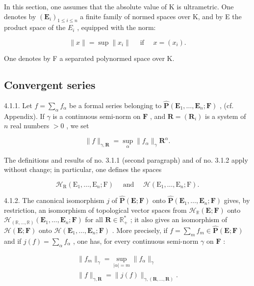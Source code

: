 In this section, one assumes that the absolute value of K is ultrametric. One denotes by \((\mathbf{E}_{i})_{1\leqslant i\leqslant n}\) a finite family of normed spaces over K, and by E the product space of the \(E_{i}\) , equipped with the norm:

\[
\| x \| = \sup \| x _ {i} \| \quad \text { if } \quad x = (x _ {i}).
\]

One denotes by F a separated polynormed space over K.

\subsection{Convergent series}

4.1.1. Let \(f = \sum_{\alpha} f_{\alpha}\) be a formal series belonging to \(\hat{\mathbf{P}}(\mathbf{E}_1, \ldots, \mathbf{E}_n; \mathbf{F})\) , (cf. Appendix). If \(\gamma\) is a continuous semi-norm on \(\mathbf{F}\) , and \(\mathbf{R} = (\mathbf{R}_i)\) is a system of \(n\) real numbers \(>0\) , we set

\[
\| f \| _ {\gamma , \mathbf {R}} = \sup _ {\alpha} \| f _ {\alpha} \| _ {\gamma} \mathbf {R} ^ {\alpha}.
\]

The definitions and results of no. 3.1.1 (second paragraph) and of no. 3.1.2 apply without change; in particular, one defines the spaces

\[
\mathcal {H} _ {\mathrm{R}} (\mathrm{E} _ {1}, \dots , \mathrm{E} _ {n}; \mathrm{F}) \quad \text { and } \quad \mathcal {H} (\mathrm{E} _ {1}, \dots , \mathrm{E} _ {n}; \mathrm{F}).
\]

4.1.2. The canonical isomorphism \(j\) of \(\hat{\mathbf{P}}(\mathbf{E};\mathbf{F})\) onto \(\hat{\mathbf{P}}(\mathbf{E}_{1},\ldots,\mathbf{E}_{n};\mathbf{F})\) gives, by restriction, an isomorphism of topological vector spaces from \(\mathcal{H}_{\mathbb{R}}(\mathbf{E};\mathbf{F})\) onto \(\mathcal{H}_{(\mathbb{R},\ldots,\mathbb{R})}(\mathbf{E}_{1},\ldots,\mathbf{E}_{n};\mathbf{F})\) for all \(\mathbf{R}\in\mathbb{R}_{+}^{*}\) ; it also gives an isomorphism of \(\mathcal{H}(\mathbf{E};\mathbf{F})\) onto \(\mathcal{H}(\mathbf{E}_{1},\ldots,\mathbf{E}_{n};\mathbf{F})\) . More precisely, if \(f=\sum_{m}f_{m}\in\hat{\mathbf{P}}(\mathbf{E};\mathbf{F})\) and if \(j(f)=\sum_{\alpha}f_{\alpha}\) , one has, for every continuous semi-norm \(\gamma\) on \(\mathbf{F}\) :

\[
\begin{array}{l} \| f _ {m} \| _ {\gamma} = \sup _ {| \alpha | = m} \| f _ {\alpha} \| _ {\gamma} \\ \| f \| _ {\gamma , \mathbf {R}} = \| j (f) \| _ {\gamma , (\mathbf {R}, \dots , \mathbf {R})}. \end{array}
\]

